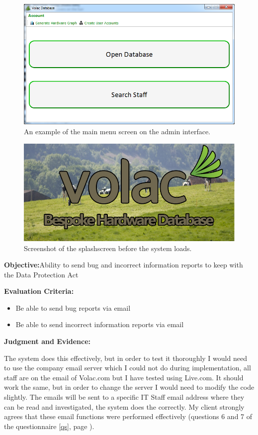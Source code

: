 \begin{figure}[H]
    \includegraphics[width=\textwidth]{./Manual/Images/graph.png}
    \caption{An example of the main menu screen on the admin interface.} 
\end{figure}

\begin{figure}[H]
    \includegraphics[width=\textwidth]{./Evaluation/Images/splashscreen.png}
 \caption{Screenshot of the splashscreen before the system loads.} 
\end{figure}

\textbf{Objective:}Ability to send bug and incorrect information reports to keep with the Data Protection Act

\textbf{Evaluation Criteria:}
\begin{itemize}
\item{Be able to send bug reports via email}
\item{Be able to send incorrect information reports via email}
\end{itemize}

\textbf{Judgment and Evidence:}

The system does this effectively, but in order to test it thoroughly I would need to use the company email server which I could not do during implementation, all staff are on the email of Volac.com but I have tested using Live.com. It should work the same, but in order to change the server I would need to modify the code slightly. The emails will be sent to a specific IT Staff email address where they can be read and investigated, the system does the correctly. My client strongly agrees that these email functions were performed effectively (questions 6 and 7 of the questionnaire \ref{qs}, page \pageref{qs}).



